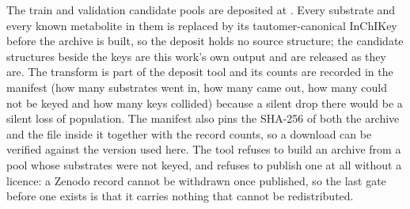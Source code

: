 \documentclass[journal=jcisd8,manuscript=suppinfo,layout=onecolumn]{achemso}
\begin{document}
The train and validation candidate pools are deposited at \ZenodoDoi{}. Every substrate and
every known metabolite in them is replaced by its tautomer-canonical InChIKey before the
archive is built, so the deposit holds no source structure; the candidate structures beside the
keys are this work's own output and are released as they are. The transform is part of the
deposit tool and its counts are recorded in the manifest (how many substrates went in, how
many came out, how many could not be keyed and how many keys collided) because a silent drop
there would be a silent loss of population. The manifest also pins the SHA-256 of both the
archive and the file inside it together with the record counts, so a download can be verified
against the version used here. The tool refuses to build an archive from a pool whose substrates
were not keyed, and refuses to publish one at all without a licence: a Zenodo record cannot be
withdrawn once published, so the last gate before one exists is that it carries nothing that
cannot be redistributed.


\end{document}
